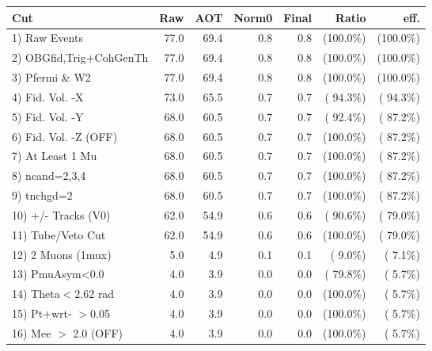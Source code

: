  \begin{table}[h!]\centering
 \begin{tabular}{||l||r|r|r|r|r|r||}
 \hline
 \hline
 Cut & Raw & AOT & Norm0 & Final & Ratio & eff.       \\
 \hline
  1) Raw Events           &         77.0 &         69.4 &          0.8 &          0.8 & (100.0\%) & (100.0\%) \\
  2) OBGfid,Trig+CohGenTh &         77.0 &         69.4 &          0.8 &          0.8 & (100.0\%) & (100.0\%) \\
  3) Pfermi \& W2         &         77.0 &         69.4 &          0.8 &          0.8 & (100.0\%) & (100.0\%) \\
  4) Fid. Vol. -X         &         73.0 &         65.5 &          0.7 &          0.7 & ( 94.3\%) & ( 94.3\%) \\
  5) Fid. Vol. -Y         &         68.0 &         60.5 &          0.7 &          0.7 & ( 92.4\%) & ( 87.2\%) \\
  6) Fid. Vol. -Z (OFF)   &         68.0 &         60.5 &          0.7 &          0.7 & (100.0\%) & ( 87.2\%) \\
  7) At Least 1 Mu        &         68.0 &         60.5 &          0.7 &          0.7 & (100.0\%) & ( 87.2\%) \\
  8) ncand=2,3,4          &         68.0 &         60.5 &          0.7 &          0.7 & (100.0\%) & ( 87.2\%) \\
  9) tnchgd=2             &         68.0 &         60.5 &          0.7 &          0.7 & (100.0\%) & ( 87.2\%) \\
 10) +/- Tracks (V0)      &         62.0 &         54.9 &          0.6 &          0.6 & ( 90.6\%) & ( 79.0\%) \\
 11) Tube/Veto Cut        &         62.0 &         54.9 &          0.6 &          0.6 & (100.0\%) & ( 79.0\%) \\
 12) 2 Muons (1mux)       &          5.0 &          4.9 &          0.1 &          0.1 & (  9.0\%) & (  7.1\%) \\
 13) PmuAsym<0.0          &          4.0 &          3.9 &          0.0 &          0.0 & ( 79.8\%) & (  5.7\%) \\
 14) Theta$<$2.62 rad     &          4.0 &          3.9 &          0.0 &          0.0 & (100.0\%) & (  5.7\%) \\
 15) Pt+wrt- $>$0.05      &          4.0 &          3.9 &          0.0 &          0.0 & (100.0\%) & (  5.7\%) \\
 16) Mee $>$ 2.0  (OFF)   &          4.0 &          3.9 &          0.0 &          0.0 & (100.0\%) & (  5.7\%) \\

\end{tabular}
\end{table}
